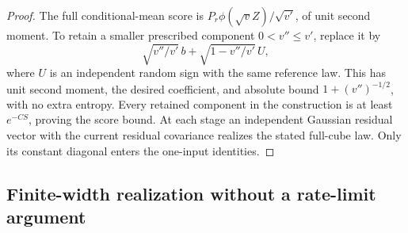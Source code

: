 \begin{proof}
The full conditional-mean score is
$P_r\phi(\sqrt vZ)/\sqrt{v'}$, of unit second moment. To retain
a smaller prescribed component $0<v''\le v'$, replace it by
\[
 \sqrt{v''/v'}\,b+\sqrt{1-v''/v'}\,U,
\]
where $U$ is an independent random sign with the same reference law.
This has unit second moment, the desired coefficient, and absolute
bound $1+(v'')^{-1/2}$, with no extra entropy. Every retained component
in the construction is at least $e^{-CS}$, proving the score bound.
At each stage an independent Gaussian residual vector with the current
residual covariance realizes the stated full-cube law. Only its
constant diagonal enters the one-input identities.
\end{proof}

\subsection{Finite-width realization without a rate-limit argument}

